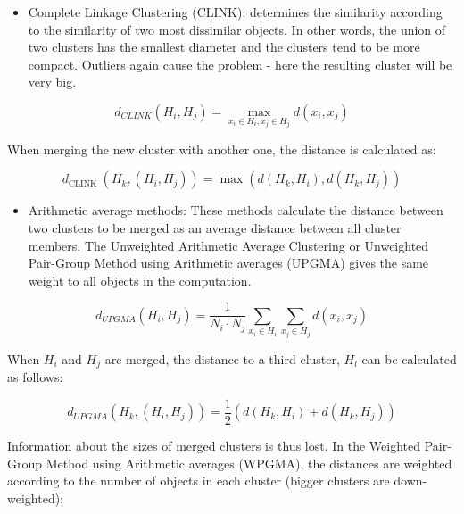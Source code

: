\begin{itemize}
  \item Complete Linkage Clustering (CLINK): determines the similarity according to the similarity of two most dissimilar objects. In other words, the union of two clusters has the smallest diameter and the clusters tend to be more compact. Outliers again cause the problem - here the resulting cluster will be very big.
\end{itemize}


\begin{equation*}
d_{C L I N K}\left(H_{i}, H_{j}\right)=\max _{x_{i} \in H_{i}, x_{j} \in H_{j}} d\left(x_{i}, x_{j}\right) \tag{12.27}
\end{equation*}


When merging the new cluster with another one, the distance is calculated as:


\begin{equation*}
d_{\text {CLINK }}\left(H_{k},\left(H_{i}, H_{j}\right)\right)=\max \left(d\left(H_{k}, H_{i}\right), d\left(H_{k}, H_{j}\right)\right) \tag{12.28}
\end{equation*}


\begin{itemize}
  \item Arithmetic average methods: These methods calculate the distance between two clusters to be merged as an average distance between all cluster members. The Unweighted Arithmetic Average Clustering or Unweighted Pair-Group Method using Arithmetic averages (UPGMA) gives the same weight to all objects in the computation.
\end{itemize}


\begin{equation*}
d_{U P G M A}\left(H_{i}, H_{j}\right)=\frac{1}{N_{i} \cdot N_{j}} \sum_{x_{i} \in H_{i}} \sum_{x_{j} \in H_{j}} d\left(x_{i}, x_{j}\right) \tag{12.29}
\end{equation*}


When $H_{i}$ and $H_{j}$ are merged, the distance to a third cluster, $H_{l}$ can be calculated as follows:


\begin{equation*}
d_{U P G M A}\left(H_{k},\left(H_{i}, H_{j}\right)\right)=\frac{1}{2}\left(d\left(H_{k}, H_{i}\right)+d\left(H_{k}, H_{j}\right)\right) \tag{12.30}
\end{equation*}


Information about the sizes of merged clusters is thus lost. In the Weighted Pair-Group Method using Arithmetic averages (WPGMA), the distances are weighted according to the number of objects in each cluster (bigger clusters are down-weighted):


